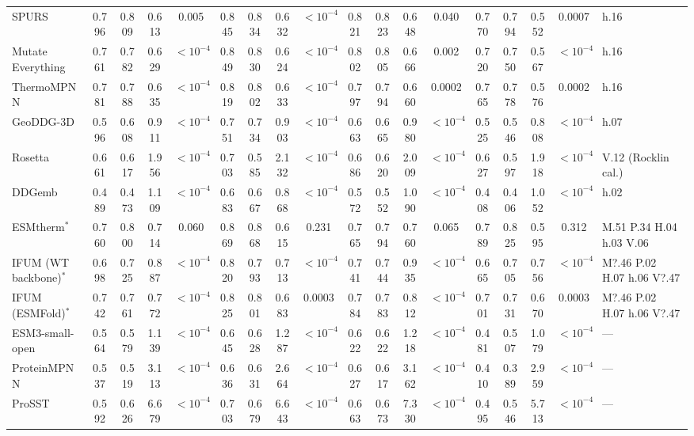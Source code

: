 \begin{table}[H]
{\begin{tabular}{lccccccccccccccccl}
SPURS & 0.796 & 0.809 & 0.613 & 0.005 & 0.845 & 0.834 & 0.632 & $<10^{-4}$ & 0.821 & 0.823 & 0.648 & 0.040 & 0.770 & 0.794 & 0.552 & 0.0007 & h.16 \\
Mutate Everything & 0.761 & 0.782 & 0.629 & $<10^{-4}$ & 0.849 & 0.830 & 0.624 & $<10^{-4}$ & 0.802 & 0.805 & 0.666 & 0.002 & 0.720 & 0.750 & 0.567 & $<10^{-4}$ & h.16 \\
ThermoMPNN & 0.781 & 0.788 & 0.635 & $<10^{-4}$ & 0.819 & 0.802 & 0.633 & $<10^{-4}$ & 0.797 & 0.794 & 0.660 & 0.0002 & 0.765 & 0.778 & 0.576 & 0.0002 & h.16 \\
GeoDDG-3D & 0.596 & 0.608 & 0.911 & $<10^{-4}$ & 0.751 & 0.734 & 0.903 & $<10^{-4}$ & 0.663 & 0.665 & 0.980 & $<10^{-4}$ & 0.525 & 0.546 & 0.808 & $<10^{-4}$ & h.07 \\
Rosetta & 0.661 & 0.617 & 1.956 & $<10^{-4}$ & 0.703 & 0.585 & 2.132 & $<10^{-4}$ & 0.686 & 0.620 & 2.009 & $<10^{-4}$ & 0.627 & 0.597 & 1.918 & $<10^{-4}$ & V.12 (Rocklin cal.) \\
DDGemb & 0.489 & 0.473 & 1.109 & $<10^{-4}$ & 0.683 & 0.667 & 0.868 & $<10^{-4}$ & 0.572 & 0.552 & 1.090 & $<10^{-4}$ & 0.408 & 0.406 & 1.052 & $<10^{-4}$ & h.02 \\
ESMtherm$^*$ & 0.760 & 0.800 & 0.714 & 0.060 & 0.869 & 0.868 & 0.615 & 0.231 & 0.765 & 0.794 & 0.760 & 0.065 & 0.789 & 0.825 & 0.595 & 0.312 & M.51 P.34 H.04 h.03 V.06 \\
IFUM (WT backbone)$^*$ & 0.698 & 0.725 & 0.887 & $<10^{-4}$ & 0.820 & 0.793 & 0.713 & $<10^{-4}$ & 0.741 & 0.744 & 0.935 & $<10^{-4}$ & 0.665 & 0.705 & 0.756 & $<10^{-4}$ & M?.46 P.02 H.07 h.06 V?.47 \\
IFUM (ESMFold)$^*$ & 0.742 & 0.761 & 0.772 & $<10^{-4}$ & 0.825 & 0.801 & 0.683 & 0.0003 & 0.784 & 0.783 & 0.812 & $<10^{-4}$ & 0.701 & 0.731 & 0.670 & 0.0003 & M?.46 P.02 H.07 h.06 V?.47 \\
ESM3-small-open & 0.564 & 0.579 & 1.139 & $<10^{-4}$ & 0.645 & 0.628 & 1.287 & $<10^{-4}$ & 0.622 & 0.622 & 1.218 & $<10^{-4}$ & 0.481 & 0.507 & 1.079 & $<10^{-4}$ & --- \\
ProteinMPNN & 0.537 & 0.519 & 3.113 & $<10^{-4}$ & 0.636 & 0.631 & 2.664 & $<10^{-4}$ & 0.627 & 0.617 & 3.162 & $<10^{-4}$ & 0.410 & 0.389 & 2.959 & $<10^{-4}$ & --- \\
ProSST & 0.592 & 0.626 & 6.679 & $<10^{-4}$ & 0.703 & 0.679 & 6.643 & $<10^{-4}$ & 0.663 & 0.673 & 7.330 & $<10^{-4}$ & 0.495 & 0.546 & 5.713 & $<10^{-4}$ & --- \\
\bottomrule
\end{tabular}
}
\end{table}



